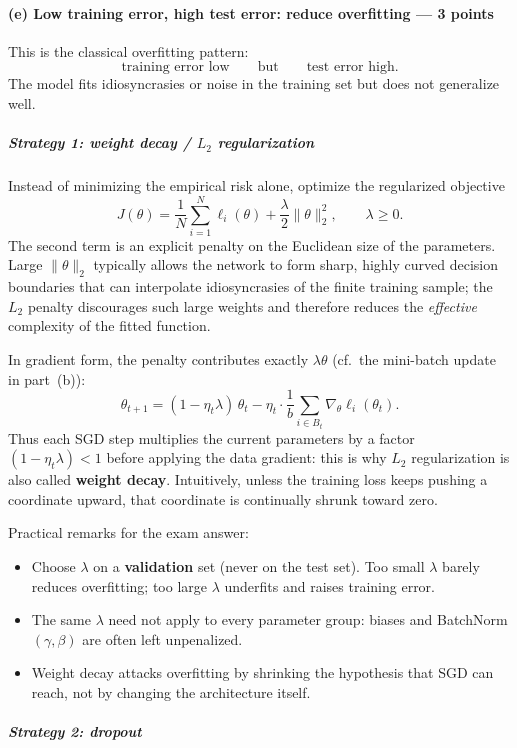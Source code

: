 \documentclass[11pt,a4paper]{article}
\theoremstyle{definition}
\begin{document}
\paragraph{(e) Low training error, high test error: reduce overfitting --- 3 points}

This is the classical overfitting pattern:
\[
\text{training error low}
\qquad\text{but}\qquad
\text{test error high}.
\]
The model fits idiosyncrasies or noise in the training set but does not generalize well.

\subparagraph{Strategy 1: weight decay / $L_2$ regularization}

Instead of minimizing the empirical risk alone, optimize the regularized objective
\[
J(\theta)
=
\frac{1}{N}\sum_{i=1}^N\ell_i(\theta)
+
\frac{\lambda}{2}\|\theta\|_2^2,
\qquad
\lambda\ge 0.
\]
The second term is an explicit penalty on the Euclidean size of the parameters. Large $\|\theta\|_2$ typically allows the network to form sharp, highly curved decision boundaries that can interpolate idiosyncrasies of the finite training sample; the $L_2$ penalty discourages such large weights and therefore reduces the \emph{effective} complexity of the fitted function.

In gradient form, the penalty contributes exactly $\lambda\theta$ (cf.\ the mini-batch update in part~(b)):
\[
\theta_{t+1}
=
(1-\eta_t\lambda)\,\theta_t
-
\eta_t\cdot\frac{1}{b}\sum_{i\in B_t}\nabla_\theta\ell_i(\theta_t).
\]
Thus each SGD step multiplies the current parameters by a factor $(1-\eta_t\lambda)<1$ before applying the data gradient: this is why $L_2$ regularization is also called \textbf{weight decay}. Intuitively, unless the training loss keeps pushing a coordinate upward, that coordinate is continually shrunk toward zero.

Practical remarks for the exam answer:
\begin{itemize}
  \item Choose $\lambda$ on a \textbf{validation} set (never on the test set). Too small $\lambda$ barely reduces overfitting; too large $\lambda$ underfits and raises training error.
  \item The same $\lambda$ need not apply to every parameter group: biases and BatchNorm $(\gamma,\beta)$ are often left unpenalized.
  \item Weight decay attacks overfitting by shrinking the hypothesis that SGD can reach, not by changing the architecture itself.
\end{itemize}

\subparagraph{Strategy 2: dropout}
\end{document}

